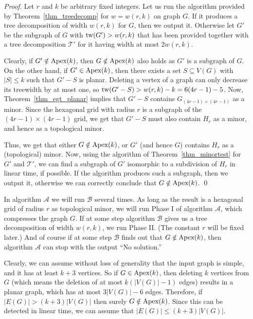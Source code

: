 \documentclass{llncs}
\begin{document}
\begin{proof}
Let $r$ and $k$ be arbitrary fixed integers.
Let us run the algorithm provided by Theorem~\ref{thm_treedecomp} for $w=w(r,k)$ on graph $G$.
If it produces a tree decomposition of width $w(r,k)$ for $G$, then we output it.
Otherwise let $G'$ be the subgraph of $G$ with $\textup{tw}(G')>w(r,k)$ that has been provided
together with a tree decomposition $\mathcal{T}'$ for it having width at most $2w(r,k)$.

Clearly, if $G' \notin \textup{Apex}(k)$, then $G \notin \textup{Apex}(k)$ also holds as $G'$ is a subgraph of $G$.
On the other hand, if $G' \in \textup{Apex}(k)$, then there exists a set $S \subseteq V(G)$ with $|S| \leq k$
such that $G'-S$ is planar. Deleting a vertex of a graph can only decrease its treewidth by at most one,
so $\textup{tw}(G'-S) > w(r,k)-k=6(4r-1)-5$. Now, Theorem~\ref{thm_egt_planar} implies that
$G'-S$ contains $G_{(4r-1) \times (4r-1)}$ as a minor.
Since the hexagonal grid with radius $r$ is a subgraph of the $(4r-1) \times (4r-1)$ grid,
we get that $G'-S$ must also contain $H_r$ as a minor, and hence as a topological minor.

Thus, we get that either $G \notin \textup{Apex}(k)$, or $G'$ (and hence $G$)
contains $H_r$ as a (topological) minor. Now, using the algorithm of
Theorem~\ref{thm_minortest} for $G'$ and $\mathcal{T}'$,
we can find a subgraph of $G'$ isomorphic to a subdivision of $H_r$ in linear time, if possible.
If the algorithm produces such a subgraph, then we output it, otherwise we can correctly conclude
that $G \notin \textup{Apex}(k)$.
\qed
\end{proof}

In algorithm $\mathcal{A}$ we will run $\mathcal{B}$ several times.
As long as the result is a hexagonal grid of radius $r$ as topological minor,
we will run Phase I of algorithm $\mathcal{A}$, which compresses the graph $G$.
If at some step algorithm $\mathcal{B}$ gives us a tree
decomposition of width $w(r,k)$, we run Phase II.
(The constant $r$ will be fixed later.) And of course if at some step
$\mathcal{B}$ finds out that $G \notin \textup{Apex}(k)$, then
algorithm $\mathcal{A}$ can stop with the output ``No solution.''

Clearly, we can assume without loss of generality that the input graph is simple,
and it has at least $k+3$ vertices.
So if $G \in \textup{Apex}(k)$, then deleting $k$ vertices from $G$
(which means the deletion of at most $k(|V(G)|-1)$ edges) results in a planar graph,
which has at most $3|V(G)|-6$ edges.
Therefore, if $|E(G)|>(k+3)|V(G)|$ then surely $G \notin \textup{Apex}(k)$.
Since this can be detected in linear time, we can assume that $|E(G)|\leq (k+3)|V(G)|$.
\end{document}
